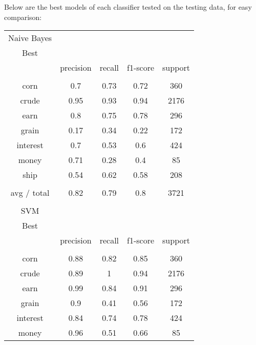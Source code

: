 \documentclass[11pt]{article}
\begin{document}
Below are the best models of each classifier tested on the testing data, for easy comparison:
\begin{table}[h]
\centering
\begin{tabular}{| c | c | c | c | c |}
Naive Bayes   &           &        &          &         \\
Best          &           &        &          &         \\
             & precision & recall & f1-score & support \\
             &           &        &          &         \\
corn          & 0.7       & 0.73   & 0.72     & 360     \\
crude         & 0.95      & 0.93   & 0.94     & 2176    \\
earn          & 0.8       & 0.75   & 0.78     & 296     \\
grain         & 0.17      & 0.34   & 0.22     & 172     \\
interest      & 0.7       & 0.53   & 0.6      & 424     \\
money         & 0.71      & 0.28   & 0.4      & 85      \\
ship          & 0.54      & 0.62   & 0.58     & 208     \\
             &           &        &          &         \\
avg / total   & 0.82      & 0.79   & 0.8      & 3721    \\
             &           &        &          &         \\
SVM           &           &        &          &         \\
Best          &           &        &          &         \\
             & precision & recall & f1-score & support \\
             &           &        &          &         \\
corn          & 0.88      & 0.82   & 0.85     & 360     \\
crude         & 0.89      & 1      & 0.94     & 2176    \\
earn          & 0.99      & 0.84   & 0.91     & 296     \\
grain         & 0.9       & 0.41   & 0.56     & 172     \\
interest      & 0.84      & 0.74   & 0.78     & 424     \\
money         & 0.96      & 0.51   & 0.66     & 85      \\

\end{tabular}
\end{table}
\end{document}
